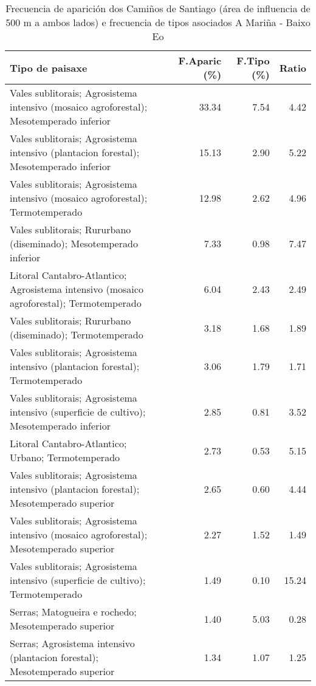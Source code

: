 \begin{table}[p]
\centering
\caption{Frecuencia de aparición dos Camiños de Santiago (área de influencia de 500 m a ambos lados) e frecuencia de tipos asociados A Mariña - Baixo Eo} 
\label{vcamino2}
\begin{tabular}{lrrr}
  \hline
Tipo de paisaxe & F.Aparic (\%) & F.Tipo (\%) & Ratio \\ 
  \hline
Vales sublitorais; Agrosistema intensivo (mosaico agroforestal); Mesotemperado inferior & 33.34 & 7.54 & 4.42 \\ 
  Vales sublitorais; Agrosistema intensivo (plantacion forestal); Mesotemperado inferior & 15.13 & 2.90 & 5.22 \\ 
  Vales sublitorais; Agrosistema intensivo (mosaico agroforestal); Termotemperado & 12.98 & 2.62 & 4.96 \\ 
  Vales sublitorais; Rururbano (diseminado); Mesotemperado inferior & 7.33 & 0.98 & 7.47 \\ 
  Litoral Cantabro-Atlantico; Agrosistema intensivo (mosaico agroforestal); Termotemperado & 6.04 & 2.43 & 2.49 \\ 
  Vales sublitorais; Rururbano (diseminado); Termotemperado & 3.18 & 1.68 & 1.89 \\ 
  Vales sublitorais; Agrosistema intensivo (plantacion forestal); Termotemperado & 3.06 & 1.79 & 1.71 \\ 
  Vales sublitorais; Agrosistema intensivo (superficie de cultivo); Mesotemperado inferior & 2.85 & 0.81 & 3.52 \\ 
  Litoral Cantabro-Atlantico; Urbano; Termotemperado & 2.73 & 0.53 & 5.15 \\ 
  Vales sublitorais; Agrosistema intensivo (plantacion forestal); Mesotemperado superior & 2.65 & 0.60 & 4.44 \\ 
  Vales sublitorais; Agrosistema intensivo (mosaico agroforestal); Mesotemperado superior & 2.27 & 1.52 & 1.49 \\ 
  Vales sublitorais; Agrosistema intensivo (superficie de cultivo); Termotemperado & 1.49 & 0.10 & 15.24 \\ 
  Serras; Matogueira e rochedo; Mesotemperado superior & 1.40 & 5.03 & 0.28 \\ 
  Serras; Agrosistema intensivo (plantacion forestal); Mesotemperado superior & 1.34 & 1.07 & 1.25 \\ 
   \hline
\end{tabular}
\end{table}

